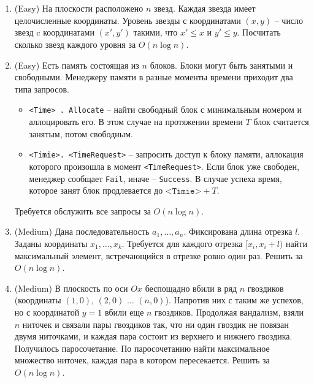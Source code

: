 \section{}

\begin{enumerate}

  \item (Easy) На плоскости расположено $n$ звезд.
  Каждая звезда имеет целочисленные координаты.
  Уровень звезды с координатами $(x, y)$ -- число
  звезд c координатами $(x', y')$ такими, что
  $x' \leq x$ и $y' \leq y$. Посчитать сколько звезд
  каждого уровня за $O(n \log n)$.

  \item (Easy) Есть память состоящая из $n$ блоков. Блоки могут
  быть занятыми и свободными.
  Менеджеру памяти в разные моменты времени приходит два типа
  запросов.
  \begin{itemize}
    \item \texttt{<Time> . Allocate} -- найти свободный блок с минимальным номером
    и аллоцировать его. В этом случае на протяжении времени $T$ блок считается занятым,
    потом свободным.
    \item \texttt{<Timie>. <TimeRequest>} -- запросить доступ к блоку памяти, аллокация 
    которого произошла в момент \texttt{<TimeRequest>}. Если блок уже свободен, менеджер
    сообщает \texttt{Fail}, иначе -- \texttt{Success}. В случае успеха время, которое 
    занят блок продлевается до $\texttt{<Timie>} + T$.
  \end{itemize}
  Требуется обслужить все запросы за $O(n \log n)$.

  \item (Medium) Дана последовательность $a_1, \dots, a_n$. Фиксирована 
  длина отрезка $l$. Заданы координаты $x_1, \dots, x_k$. Требуется
  для каждого отрезка $[x_i, x_i + l)$ найти максимальный элемент, 
  встречающийся в отрезке ровно один раз. Решить за $O(n \log n)$.

  \item (Medium) В плоскость по оси $Ox$ беспощадно вбили в ряд $n$ гвоздиков 
  (координаты $(1, 0)$, $(2, 0)$ $\dots$ $(n, 0)$). Напротив них с таким же успехов, 
  но с координатой $y = 1$ вбили еще $n$ гвоздиков. Продолжая вандализм, взяли $n$
  ниточек и связали пары гвоздиков так, что ни один гвоздик не повязан двумя ниточками,
  и каждая пара состоит из верхнего и нижнего гвоздика. Получилось паросочетание.
  По паросочетанию найти максимальное множество ниточек, каждая пара в котором пересекается.
  Решить за $O(n \log n)$.



\end{enumerate}
